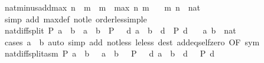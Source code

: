 \begin{isabellebody}
\ nat{\isacharunderscore}{\kern0pt}minus{\isacharunderscore}{\kern0pt}add{\isacharunderscore}{\kern0pt}max{\isacharcolon}{\kern0pt}\ {\isachardoublequoteopen}n\ {\isacharminus}{\kern0pt}\ m\ {\isacharplus}{\kern0pt}\ m\ {\isacharequal}{\kern0pt}\ max\ n\ m{\isachardoublequoteclose}\isanewline
\ \ \ m\ n\ {\isacharcolon}{\kern0pt}{\isacharcolon}{\kern0pt}\ nat\isanewline
%
\isadelimproof
\ \ %
\endisadelimproof
%
\isatagproof
{}\isamarkupfalse%
\ {\isacharparenleft}{\kern0pt}simp\ add{\isacharcolon}{\kern0pt}\ max{\isacharunderscore}{\kern0pt}def\ not{\isacharunderscore}{\kern0pt}le\ order{\isacharunderscore}{\kern0pt}less{\isacharunderscore}{\kern0pt}imp{\isacharunderscore}{\kern0pt}le{\isacharparenright}{\kern0pt}%
\endisatagproof
{\isafoldproof}%
%
\isadelimproof
\isanewline
%
\endisadelimproof
\isanewline
{}\isamarkupfalse%
\ nat{\isacharunderscore}{\kern0pt}diff{\isacharunderscore}{\kern0pt}split{\isacharcolon}{\kern0pt}\ {\isachardoublequoteopen}P\ {\isacharparenleft}{\kern0pt}a\ {\isacharminus}{\kern0pt}\ b{\isacharparenright}{\kern0pt}\ {\isasymlongleftrightarrow}\ {\isacharparenleft}{\kern0pt}a\ {\isacharless}{\kern0pt}\ b\ {\isasymlongrightarrow}\ P\ {}{\isacharparenright}{\kern0pt}\ {\isasymand}\ {\isacharparenleft}{\kern0pt}{\isasymforall}d{\isachardot}{\kern0pt}\ a\ {\isacharequal}{\kern0pt}\ b\ {\isacharplus}{\kern0pt}\ d\ {\isasymlongrightarrow}\ P\ d{\isacharparenright}{\kern0pt}{\isachardoublequoteclose}\isanewline
\ \ \ a\ b\ {\isacharcolon}{\kern0pt}{\isacharcolon}{\kern0pt}\ nat\isanewline
\ \ %
\isanewline
%
\isadelimproof
\ \ %
\endisadelimproof
%
\isatagproof
{}\isamarkupfalse%
\ {\isacharparenleft}{\kern0pt}cases\ {\isachardoublequoteopen}a\ {\isacharless}{\kern0pt}\ b{\isachardoublequoteclose}{\isacharparenright}{\kern0pt}\ {\isacharparenleft}{\kern0pt}auto\ simp\ add{\isacharcolon}{\kern0pt}\ not{\isacharunderscore}{\kern0pt}less\ le{\isacharunderscore}{\kern0pt}less\ dest{\isacharbang}{\kern0pt}{\isacharcolon}{\kern0pt}\ add{\isacharunderscore}{\kern0pt}eq{\isacharunderscore}{\kern0pt}self{\isacharunderscore}{\kern0pt}zero\ {\isacharbrackleft}{\kern0pt}OF\ sym{\isacharbrackright}{\kern0pt}{\isacharparenright}{\kern0pt}%
\endisatagproof
{\isafoldproof}%
%
\isadelimproof
\isanewline
%
\endisadelimproof
\isanewline
{}\isamarkupfalse%
\ nat{\isacharunderscore}{\kern0pt}diff{\isacharunderscore}{\kern0pt}split{\isacharunderscore}{\kern0pt}asm{\isacharcolon}{\kern0pt}\ {\isachardoublequoteopen}P\ {\isacharparenleft}{\kern0pt}a\ {\isacharminus}{\kern0pt}\ b{\isacharparenright}{\kern0pt}\ {\isasymlongleftrightarrow}\ {\isasymnot}\ {\isacharparenleft}{\kern0pt}a\ {\isacharless}{\kern0pt}\ b\ {\isasymand}\ {\isasymnot}\ P\ {}\ {\isasymor}\ {\isacharparenleft}{\kern0pt}{\isasymexists}d{\isachardot}{\kern0pt}\ a\ {\isacharequal}{\kern0pt}\ b\ {\isacharplus}{\kern0pt}\ d\ {\isasymand}\ {\isasymnot}\ P\ d{\isacharparenright}{\kern0pt}{\isacharparenright}{\kern0pt}{\isachardoublequoteclose}\isanewline

\end{isabellebody}
